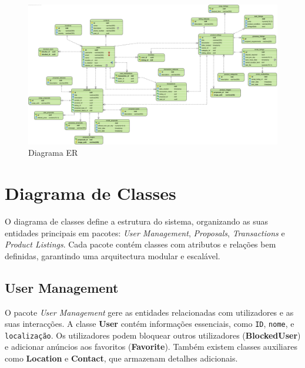\documentclass[a4paper, 12pt]{article} %
\begin{document}
\begin{figure}[ht]
	\centering
	\includegraphics[width=\textwidth]{../images/entity-relationship-diagram.png}
	\caption{Diagrama ER}
	\label{fig:diagrama_er}
\end{figure}


\clearpage
\newpage
\section{Diagrama de Classes}

O diagrama de classes define a estrutura do sistema, organizando as suas entidades principais em pacotes: \textit{User Management}, \textit{Proposals}, \textit{Transactions} e \textit{Product Listings}. Cada pacote contém classes com atributos e relações bem definidas, garantindo uma arquitectura modular e escalável.

\subsection{User Management}
O pacote \textit{User Management} gere as entidades relacionadas com utilizadores e as suas interacções. A classe \textbf{User} contém informações essenciais, como \verb*|ID|, \verb*|nome|, e \verb*|localização|. Os utilizadores podem bloquear outros utilizadores (\textbf{BlockedUser}) e adicionar anúncios aos favoritos (\textbf{Favorite}). Também existem classes auxiliares como \textbf{Location} e \textbf{Contact}, que armazenam detalhes adicionais.
\end{document}
